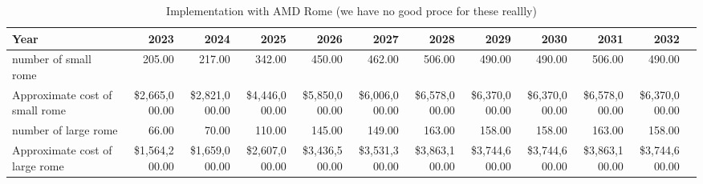 \tiny \begin{longtable} { |p{}  |r  |r  |r  |r  |r  |r  |r  |r  |r  |r  |r |} 
\caption{Implementation with AMD Rome (we have no good proce for these reallly) \label{tab:opsRome}}\\ 
\hline 
\textbf{Year}&\textbf{2023}&\textbf{2024}&\textbf{2025}&\textbf{2026}&\textbf{2027}&\textbf{2028}&\textbf{2029}&\textbf{2030}&\textbf{2031}&\textbf{2032} \\ \hline
{number of small rome }&{205.00}&{217.00}&{342.00}&{450.00}&{462.00}&{506.00}&{490.00}&{490.00}&{506.00}&{490.00} \\ \hline
{Approximate cost of small rome }&{\$2,665,000.00}&{\$2,821,000.00}&{\$4,446,000.00}&{\$5,850,000.00}&{\$6,006,000.00}&{\$6,578,000.00}&{\$6,370,000.00}&{\$6,370,000.00}&{\$6,578,000.00}&{\$6,370,000.00} \\ \hline
{number of large rome }&{66.00}&{70.00}&{110.00}&{145.00}&{149.00}&{163.00}&{158.00}&{158.00}&{163.00}&{158.00} \\ \hline
{Approximate cost of large rome }&{\$1,564,200.00}&{\$1,659,000.00}&{\$2,607,000.00}&{\$3,436,500.00}&{\$3,531,300.00}&{\$3,863,100.00}&{\$3,744,600.00}&{\$3,744,600.00}&{\$3,863,100.00}&{\$3,744,600.00} \\ \hline
\end{longtable} \normalsize
